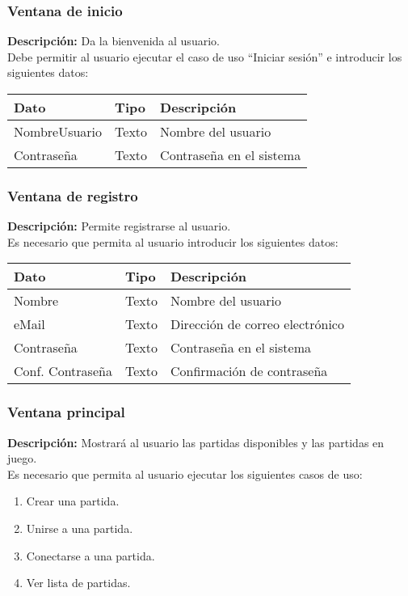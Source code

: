 \subsubsection{Ventana de inicio}
{\footnotesize

 \textbf{Descripción:} Da la bienvenida al usuario.\\ Debe permitir al usuario
ejecutar el
caso de uso ``Iniciar sesión'' e introducir los siguientes datos: \\

\begin{tabularx}{0.9\textwidth}{llX}
\hline
\textbf{Dato} & \textbf{Tipo} & \textbf{Descripción} \\
\hline
NombreUsuario & Texto & Nombre del usuario \\
Contraseña & Texto & Contraseña en el sistema \\
\hline
\end{tabularx}
}

\subsubsection{Ventana de registro}
{\footnotesize



 \textbf{Descripción:} Permite registrarse al usuario.\\
Es necesario que
permita al usuario introducir los siguientes datos: \\

\begin{tabularx}{0.9\textwidth}{llX}
\hline
\textbf{Dato} & \textbf{Tipo} & \textbf{Descripción} \\
\hline
Nombre & Texto & Nombre del usuario \\
eMail & Texto & Dirección de correo electrónico \\
Contraseña & Texto & Contraseña en el sistema \\
Conf. Contraseña & Texto & Confirmación de contraseña \\
\hline
\end{tabularx}

}

\subsubsection{Ventana principal}
{\footnotesize

 \textbf{Descripción:}  Mostrará al usuario las partidas disponibles y las
partidas en
juego.\\
Es necesario que
permita al usuario ejecutar los siguientes casos de uso: \\
\begin{enumerate}
\item Crear una partida.
\item Unirse a una partida.
\item Conectarse a una partida.
\item Ver lista de partidas.

\end{enumerate}
}

